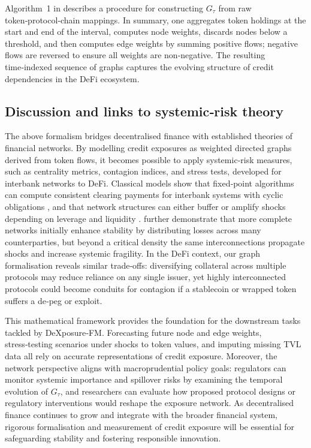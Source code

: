 Algorithm~1 in \cite{wu2025} describes a procedure for constructing $G_\tau$ from raw token‑protocol‑chain mappings.  In summary, one aggregates token holdings at the start and end of the interval, computes node weights, discards nodes below a threshold, and then computes edge weights by summing positive flows; negative flows are reversed to ensure all weights are non‑negative.  The resulting time‑indexed sequence of graphs captures the evolving structure of credit dependencies in the DeFi ecosystem.

\subsection{Discussion and links to systemic‑risk theory}

The above formalism bridges decentralised finance with established theories of financial networks.  By modelling credit exposures as weighted directed graphs derived from token flows, it becomes possible to apply systemic‑risk measures, such as centrality metrics, contagion indices, and stress tests, developed for interbank networks to DeFi.  Classical models show that fixed‑point algorithms can compute consistent clearing payments for interbank systems with cyclic obligations \cite{EisenbergNoe2001}, and that network structures can either buffer or amplify shocks depending on leverage and liquidity \cite{Glasserman2016}.  \cite{Acemoglu2013} further demonstrate that more complete networks initially enhance stability by distributing losses across many counterparties, but beyond a critical density the same interconnections propagate shocks and increase systemic fragility.  In the DeFi context, our graph formalisation reveals similar trade‑offs: diversifying collateral across multiple protocols may reduce reliance on any single issuer, yet highly interconnected protocols could become conduits for contagion if a stablecoin or wrapped token suffers a de‑peg or exploit.

This mathematical framework provides the foundation for the downstream tasks tackled by DeXposure‑FM.  Forecasting future node and edge weights, stress‑testing scenarios under shocks to token values, and imputing missing TVL data all rely on accurate representations of credit exposure.  Moreover, the network perspective aligns with macroprudential policy goals: regulators can monitor systemic importance and spillover risks by examining the temporal evolution of $G_\tau$, and researchers can evaluate how proposed protocol designs or regulatory interventions would reshape the exposure network.  As decentralised finance continues to grow and integrate with the broader financial system, rigorous formalisation and measurement of credit exposure will be essential for safeguarding stability and fostering responsible innovation.